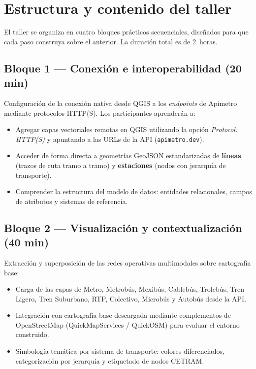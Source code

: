 
\section{Estructura y contenido del taller}

El taller se organiza en cuatro bloques prácticos secuenciales, diseñados para
que cada paso construya sobre el anterior.  La duración total es de 2~horas.

\subsection{Bloque 1 — Conexión e interoperabilidad (20 min)}

Configuración de la conexión nativa desde QGIS a los \textit{endpoints} de
Apimetro mediante protocolos HTTP(S).  Los participantes aprenderán a:

\begin{itemize}[nosep, leftmargin=1.5em]
  \item Agregar capas vectoriales remotas en QGIS utilizando la opción
    \textit{Protocol: HTTP(S)} y apuntando a las URLs de la API
    (\texttt{apimetro.dev}).
  \item Acceder de forma directa a geometrías GeoJSON estandarizadas de
    \textbf{líneas} (trazos de ruta tramo a tramo) y \textbf{estaciones}
    (nodos con jerarquía de transporte).
  \item Comprender la estructura del modelo de datos: entidades relacionales,
    campos de atributos y sistemas de referencia.
\end{itemize}

\subsection{Bloque 2 — Visualización y contextualización (40 min)}

Extracción y superposición de las redes operativas multimodales sobre
cartografía base:

\begin{itemize}[nosep, leftmargin=1.5em]
  \item Carga de las capas de Metro, Metrobús, Mexibús, Cablebús, Trolebús,
    Tren Ligero, Tren Suburbano, RTP, Colectivo, Microbús y Autobús desde
    la API.
  \item Integración con cartografía base descargada mediante complementos de
    OpenStreetMap (QuickMapServices / QuickOSM) para evaluar el entorno
    construido.
  \item Simbología temática por sistema de transporte: colores diferenciados,
    categorización por jerarquía y etiquetado de nodos CETRAM.
\end{itemize}

